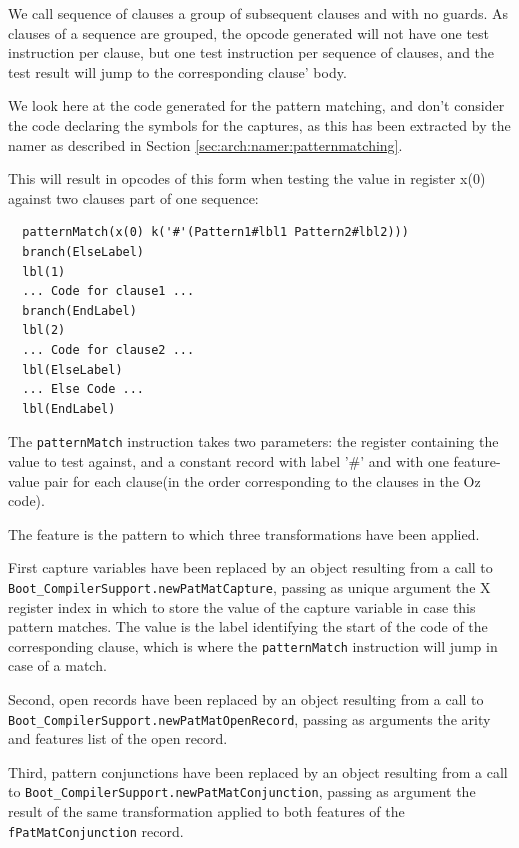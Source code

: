 \documentclass[a4paper]{memoir}
\begin{document}
We call sequence of clauses  a group of subsequent clauses and with no guards.
As clauses of a sequence are grouped, the opcode generated will not
have one test instruction per clause, but one test instruction
per sequence of clauses, and the test result will jump to the corresponding clause' body.

We look here at the code generated for the pattern matching, and don't consider
the code declaring the symbols for the captures, as this has been extracted by
the namer as described in Section \ref{sec:arch:namer:patternmatching}.

This will result in opcodes of this form when testing the value in register x(0) against two clauses part of one sequence:
\begin{lstlisting}
  patternMatch(x(0) k('#'(Pattern1#lbl1 Pattern2#lbl2)))
  branch(ElseLabel)
  lbl(1)
  ... Code for clause1 ...
  branch(EndLabel)
  lbl(2)
  ... Code for clause2 ...
  lbl(ElseLabel)
  ... Else Code ...
  lbl(EndLabel)
\end{lstlisting}



The \lstinline!patternMatch! instruction takes two parameters: the register containing the
value to test against, and a constant record with label '\#' and with one
feature-value pair for each clause(in the order corresponding to the clauses in the Oz code). 

The feature is the pattern to which three transformations have been applied. 

First capture variables have been replaced by an object resulting from a call to
\lstinline!Boot_CompilerSupport.newPatMatCapture!, passing as unique argument
the X register index in which to store the value of the capture variable in
case this pattern matches. The value is the label identifying the start of the
code of the corresponding clause, which is where the \lstinline!patternMatch! instruction
will jump in case of a match.

Second, open records have been replaced by an object resulting from a
call to \lstinline!Boot_CompilerSupport.newPatMatOpenRecord!, passing as
arguments the arity and features list of the open record.

Third, pattern conjunctions have been replaced by an object resulting from a call 
to \lstinline!Boot_CompilerSupport.newPatMatConjunction!, passing as argument the result
of the same transformation applied to both features of the \lstinline!fPatMatConjunction! record.
\end{document}

